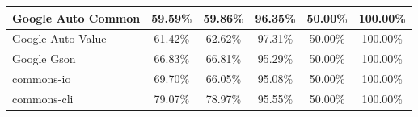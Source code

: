 \documentclass[conference,draftclsnofoot,onecolumn]{IEEEtran}
\begin{document}
\begin{table}[ht]
\begin{tabular}{|l|c|c|c|c|c|}
Google Auto Common            & 59.59\%                                                                                 & 59.86\%                                                                                     & 96.35\%                                                                              & 50.00\%                                                                               & 100.00\%                                                                             \\ \hline
Google Auto Value             & 61.42\%                                                                                 & 62.62\%                                                                                     & 97.31\%                                                                              & 50.00\%                                                                               & 100.00\%                                                                             \\ \hline
Google Gson                   & 66.83\%                                                                                 & 66.81\%                                                                                     & 95.29\%                                                                              & 50.00\%                                                                               & 100.00\%                                                                             \\ \hline
commons-io                    & 69.70\%                                                                                 & 66.05\%                                                                                     & 95.08\%                                                                              & 50.00\%                                                                               & 100.00\%                                                                             \\ \hline
commons-cli                   & 79.07\%                                                                                 & 78.97\%                                                                                     & 95.55\%                                                                              & 50.00\%                                                                               & 100.00\%                                                                             \\ \hline

\end{tabular}
\end{table}
\end{document}
